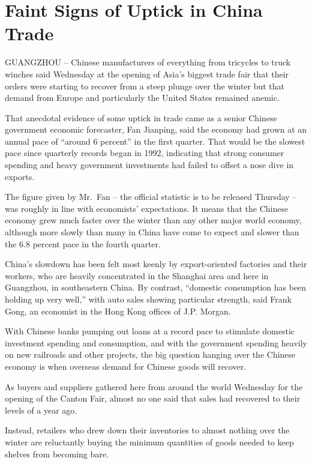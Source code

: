 \documentclass[12pt,a4paper,onecolumn]{article}
\begin{document}
\section{Faint Signs of Uptick in China Trade}

GUANGZHOU -- Chinese manufacturers of everything from tricycles to truck winches said Wednesday at
the opening of Asia's biggest trade fair that their orders were starting to recover from a steep
plunge over the winter but that demand from Europe and particularly the United States remained
anemic.

That anecdotal evidence of some uptick in trade came as a senior Chinese government economic
forecaster, Fan Jianping, said the economy had grown at an annual pace of ``around 6 percent'' in
the first quarter. That would be the slowest pace since quarterly records began in 1992, indicating
that strong consumer spending and heavy government investments had failed to offset a nose dive in
exports.

The figure given by Mr.~Fan -- the official statistic is to be released Thursday -- was roughly in
line with economists' expectations. It means that the Chinese economy grew much faster over the
winter than any other major world economy, although more slowly than many in China have come to
expect and slower than the 6.8 percent pace in the fourth quarter.

China's slowdown has been felt most keenly by export-oriented factories and their workers, who are
heavily concentrated in the Shanghai area and here in Guangzhou, in southeastern China. By contrast,
``domestic consumption has been holding up very well,'' with auto sales showing particular strength,
said Frank Gong, an economist in the Hong Kong offices of J.P. Morgan.

With Chinese banks pumping out loans at a record pace to stimulate domestic investment spending and
consumption, and with the government spending heavily on new railroads and other projects, the big
question hanging over the Chinese economy is when overseas demand for Chinese goods will recover.

As buyers and suppliers gathered here from around the world Wednesday for the opening of the Canton
Fair, almost no one said that sales had recovered to their levels of a year ago.

Instead, retailers who drew down their inventories to almost nothing over the winter are reluctantly
buying the minimum quantities of goods needed to keep shelves from becoming bare.
\end{document}
